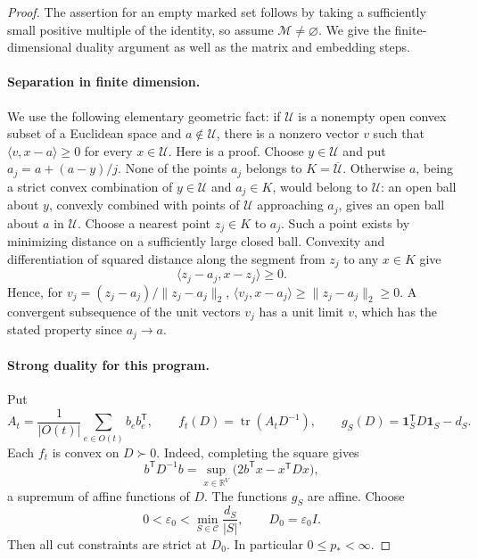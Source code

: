 \documentclass[11pt]{amsart}
\theoremstyle{definition}
\theoremstyle{remark}
\numberwithin{equation}{section}
\begin{document}
\begin{proof}
The assertion for an empty marked set follows by taking a sufficiently
small positive multiple of the identity, so assume $\mathcal M\ne\varnothing$.
We give the finite-dimensional duality argument as well as the matrix
and embedding steps.

\paragraph{Separation in finite dimension.}
We use the following elementary geometric fact: if $\mathcal U$ is a
nonempty open convex subset of a Euclidean space and $a\notin\mathcal U$,
there is a nonzero vector $v$ such that
$\langle v,x-a\rangle\geq0$ for every $x\in\mathcal U$.
Here is a proof.  Choose $y\in\mathcal U$ and put
$a_j=a+(a-y)/j$.  None of the points $a_j$ belongs to
$K=\overline{\mathcal U}$.  Otherwise $a$, being a strict convex
combination of $y\in\mathcal U$ and $a_j\in K$, would belong to
$\mathcal U$: an open ball about $y$, convexly combined with points of
$\mathcal U$ approaching $a_j$, gives an open ball about $a$ in
$\mathcal U$.  Choose a nearest point $z_j\in K$ to $a_j$.
Such a point exists by minimizing distance on a sufficiently large
closed ball.  Convexity and differentiation of squared distance along
the segment from $z_j$ to any $x\in K$ give
\[
 \langle z_j-a_j,x-z_j\rangle\geq0.
\]
Hence, for $v_j=(z_j-a_j)/\|z_j-a_j\|_2$,
$\langle v_j,x-a_j\rangle\geq\|z_j-a_j\|_2\geq0$.
A convergent subsequence of the unit vectors $v_j$ has a unit limit
$v$, which has the stated property since $a_j\to a$.

\paragraph{Strong duality for this program.}
Put
\[
 A_t=\frac1{|O(t)|}\sum_{e\in O(t)}b_eb_e^{\mathsf T},\qquad
 f_t(D)=\operatorname{tr}(A_tD^{-1}),\qquad
 g_S(D)=\mathbf1_S^{\mathsf T}D\mathbf1_S-d_S.
\]
Each $f_t$ is convex on $D\succ0$.  Indeed, completing the square gives
\[
 b^{\mathsf T}D^{-1}b
   =\sup_{x\in\mathbb R^V}
      \bigl(2b^{\mathsf T}x-x^{\mathsf T}Dx\bigr),
\]
a supremum of affine functions of $D$.  The functions $g_S$ are affine.
Choose
\[
 0<\varepsilon_0<\min_{S\in\mathcal C}\frac{d_S}{|S|},
 \qquad D_0=\varepsilon_0 I.
\]
Then all cut constraints are strict at $D_0$.  In particular
$0\leq p_*<\infty$.


\end{proof}
\end{document}
